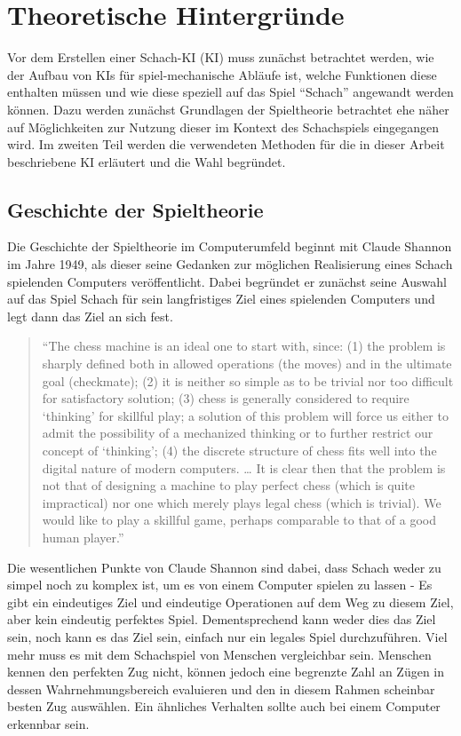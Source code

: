 
\newtheorem{definition}{Definition}[section]


\chapter{Theoretische Hintergründe}

Vor dem Erstellen einer Schach-\acs{KI} (\acl{KI}) muss zunächst betrachtet werden, wie der Aufbau von KIs für spiel-mechanische Abläufe ist, welche Funktionen diese enthalten müssen und wie diese speziell auf das Spiel ``Schach'' angewandt werden können. Dazu werden zunächst Grundlagen der Spieltheorie betrachtet ehe näher auf Möglichkeiten zur Nutzung dieser im Kontext des Schachspiels eingegangen wird. Im zweiten Teil werden die verwendeten Methoden für die in dieser Arbeit beschriebene KI erläutert und die Wahl begründet.

\section{Geschichte der Spieltheorie}

Die Geschichte der Spieltheorie im Computerumfeld beginnt mit Claude Shannon im Jahre 1949, als dieser seine Gedanken zur möglichen Realisierung eines Schach spielenden Computers veröffentlicht. Dabei begründet er zunächst seine Auswahl auf das Spiel Schach für sein langfristiges Ziel eines spielenden Computers und legt dann das Ziel an sich fest.

\begin{quote}
“The chess machine is an ideal one to start with, since: (1) the problem is sharply defined both in allowed operations (the moves) and in the ultimate goal (checkmate); (2) it is neither so simple as to be trivial nor too difficult for satisfactory solution; (3) chess is generally considered to require ‘thinking’ for skillful play; a solution of this problem will force us either to admit the possibility of a mechanized thinking or to further restrict our concept of ‘thinking’; (4) the discrete structure of chess fits well into the digital nature of modern computers. … It is clear then that the problem is not that of designing a machine to play perfect chess (which is quite impractical) nor one which merely plays legal chess (which is trivial). We would like to play a skillful game, perhaps comparable to that of a good human player.”
\end{quote}

Die wesentlichen Punkte von Claude Shannon sind dabei, dass Schach weder zu simpel noch zu komplex ist, um es von einem Computer spielen zu lassen - Es gibt ein eindeutiges Ziel und eindeutige Operationen auf dem Weg zu diesem Ziel, aber kein eindeutig perfektes Spiel. Dementsprechend kann weder dies das Ziel sein, noch kann es das Ziel sein, einfach nur ein legales Spiel durchzuführen. Viel mehr muss es mit dem Schachspiel von Menschen vergleichbar sein. Menschen kennen den perfekten Zug nicht, können jedoch eine begrenzte Zahl an Zügen in dessen Wahrnehmungsbereich evaluieren und den in diesem Rahmen scheinbar besten Zug auswählen. Ein ähnliches Verhalten sollte auch bei einem Computer erkennbar sein.

